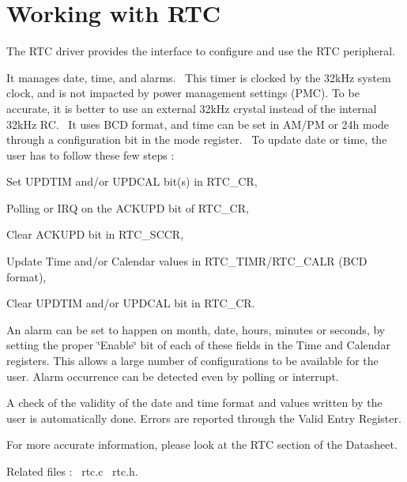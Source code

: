 \hypertarget{group__rtc__module}{}\section{Working with R\+TC}
\label{group__rtc__module}
The R\+TC driver provides the interface to configure and use the R\+TC peripheral.

It manages date, time, and alarms.~\newline
This timer is clocked by the 32k\+Hz system clock, and is not impacted by power management settings (P\+MC). To be accurate, it is better to use an external 32k\+Hz crystal instead of the internal 32k\+Hz RC.~\newline
 It uses B\+CD format, and time can be set in A\+M/\+PM or 24h mode through a configuration bit in the mode register.~\newline
 To update date or time, the user has to follow these few steps \+: 
\begin{DoxyItemize}
\item Set U\+P\+D\+T\+IM and/or U\+P\+D\+C\+AL bit(s) in R\+T\+C\+\_\+\+CR, 
\item Polling or I\+RQ on the A\+C\+K\+U\+PD bit of R\+T\+C\+\_\+\+CR, 
\item Clear A\+C\+K\+U\+PD bit in R\+T\+C\+\_\+\+S\+C\+CR, 
\item Update Time and/or Calendar values in R\+T\+C\+\_\+\+T\+I\+M\+R/\+R\+T\+C\+\_\+\+C\+A\+LR (B\+CD format), 
\item Clear U\+P\+D\+T\+IM and/or U\+P\+D\+C\+AL bit in R\+T\+C\+\_\+\+CR. 
\end{DoxyItemize}An alarm can be set to happen on month, date, hours, minutes or seconds, by setting the proper \char`\"{}\+Enable\char`\"{} bit of each of these fields in the Time and Calendar registers. This allows a large number of configurations to be available for the user. Alarm occurrence can be detected even by polling or interrupt.

A check of the validity of the date and time format and values written by the user is automatically done. Errors are reported through the Valid Entry Register.

For more accurate information, please look at the R\+TC section of the Datasheet.

Related files \+:~\newline
rtc.\+c~\newline
 rtc.\+h.~\newline
 